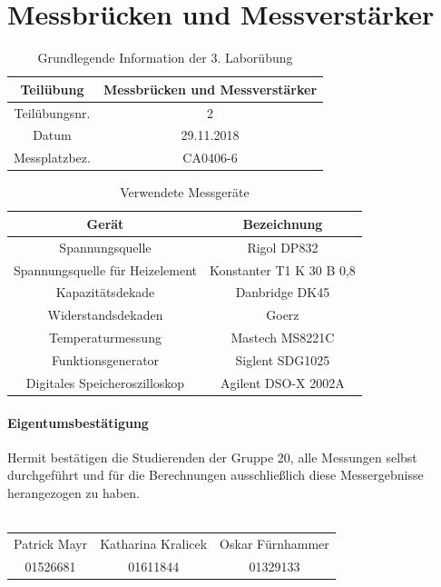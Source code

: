 \chapter{Messbrücken und Messverstärker}
\begin{table}[h]
	\centering
	\begin{tabular}{|c|c|}
		\hline 
		Teilübung 	& Messbrücken und Messverstärker \\
		\hline 
		Teilübungsnr. 		& 2	 \\ 
		\hline 
		Datum 		& 29.11.2018 \\ 
		\hline 
		Messplatzbez. 	& CA0406-6  \\
		\hline
	\end{tabular} 
	\caption{Grundlegende Information der 3. Laborübung}
\end{table}
\noindent
\begin{table}[h]
	\begin{tabular}{|c|c|}
	\hline 
	Gerät & Bezeichnung \\ 
	\hline 
	Spannungsquelle & Rigol DP832\\ 
	\hline 
	Spannungsquelle für Heizelement & Konstanter T1 K 30 B 0,8 \\ 
	\hline 
	Kapazitätsdekade & Danbridge DK45\\ 
	\hline 
	Widerstandsdekaden & Goerz \\ 
	\hline 
	Temperaturmessung & Mastech MS8221C\\ 
	\hline 
	Funktionsgenerator & Siglent SDG1025\\ 
	\hline 
	Digitales Speicheroszilloskop & Agilent DSO-X 2002A\\ 
	\hline 
	\end{tabular} 
	\centering
	\caption{Verwendete Messgeräte}
	\label{tb:messgeraete_ue3}
\end{table}

\subsubsection{Eigentumsbestätigung}
Hermit bestätigen die Studierenden der Gruppe 20, alle Messungen selbst durchgeführt und für die Berechnungen ausschließlich diese Messergebnisse herangezogen zu haben. \\ \\
\begin{tabular*}{\textwidth}{c|c|c}
	Patrick Mayr & Katharina Kralicek & Oskar Fürnhammer \\ 
	01526681 & 01611844 & 01329133 \\ 
\end{tabular*}
